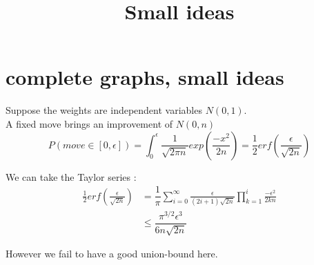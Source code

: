 \documentclass[12pt]{article}
\title{Small ideas}
\begin{document}
\maketitle

\section{complete graphs, small ideas}

Suppose the weights are independent variables $N(0,1)$.\\
A fixed move brings an improvement of $N(0, n)$\\
\begin{equation*}
P(move \in [0,\epsilon]) = \int_0^\epsilon \frac{1}{\sqrt{2\pi n}} exp(\dfrac{-x^2}{2n}) = \frac{1}{2} erf(\frac{\epsilon}{\sqrt{2n}})
\end{equation*}

We can take the Taylor series :
\begin{equation*}
\begin{split}
\frac{1}{2} erf(\frac{\epsilon}{\sqrt{2n}}) &= \dfrac{1}{\pi}\sum_{i = 0}^{\infty}\frac{\epsilon}{(2i + 1)\sqrt{2n}}\prod_{k = 1}^{i}\frac{-\epsilon^2}{2kn}\\
&\leq \dfrac{\pi^{3/2} \epsilon^3}{6n\sqrt{2n}}
\end{split}
\end{equation*}

However we fail to have a good union-bound here.
\end{document}
